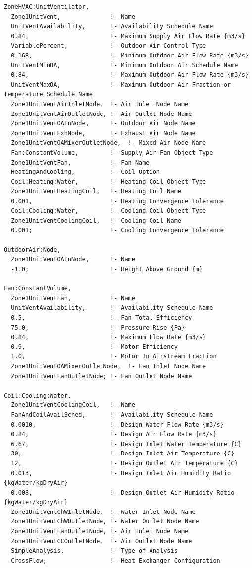 \begin{lstlisting}
ZoneHVAC:UnitVentilator,
  Zone1UnitVent,              !- Name
  UnitVentAvailability,       !- Availability Schedule Name
  0.84,                       !- Maximum Supply Air Flow Rate {m3/s}
  VariablePercent,            !- Outdoor Air Control Type
  0.168,                      !- Minimum Outdoor Air Flow Rate {m3/s}
  UnitVentMinOA,              !- Minimum Outdoor Air Schedule Name
  0.84,                       !- Maximum Outdoor Air Flow Rate {m3/s}
  UnitVentMaxOA,              !- Maximum Outdoor Air Fraction or Temperature Schedule Name
  Zone1UnitVentAirInletNode,  !- Air Inlet Node Name
  Zone1UnitVentAirOutletNode, !- Air Outlet Node Name
  Zone1UnitVentOAInNode,      !- Outdoor Air Node Name
  Zone1UnitVentExhNode,       !- Exhaust Air Node Name
  Zone1UnitVentOAMixerOutletNode,  !- Mixed Air Node Name
  Fan:ConstantVolume,         !- Supply Air Fan Object Type
  Zone1UnitVentFan,           !- Fan Name
  HeatingAndCooling,          !- Coil Option
  Coil:Heating:Water,         !- Heating Coil Object Type
  Zone1UnitVentHeatingCoil,   !- Heating Coil Name
  0.001,                      !- Heating Convergence Tolerance
  Coil:Cooling:Water,         !- Cooling Coil Object Type
  Zone1UnitVentCoolingCoil,   !- Cooling Coil Name
  0.001;                      !- Cooling Convergence Tolerance

OutdoorAir:Node,
  Zone1UnitVentOAInNode,      !- Name
  -1.0;                       !- Height Above Ground {m}

Fan:ConstantVolume,
  Zone1UnitVentFan,           !- Name
  UnitVentAvailability,       !- Availability Schedule Name
  0.5,                        !- Fan Total Efficiency
  75.0,                       !- Pressure Rise {Pa}
  0.84,                       !- Maximum Flow Rate {m3/s}
  0.9,                        !- Motor Efficiency
  1.0,                        !- Motor In Airstream Fraction
  Zone1UnitVentOAMixerOutletNode,  !- Fan Inlet Node Name
  Zone1UnitVentFanOutletNode; !- Fan Outlet Node Name

Coil:Cooling:Water,
  Zone1UnitVentCoolingCoil,   !- Name
  FanAndCoilAvailSched,       !- Availability Schedule Name
  0.0010,                     !- Design Water Flow Rate {m3/s}
  0.84,                       !- Design Air Flow Rate {m3/s}
  6.67,                       !- Design Inlet Water Temperature {C}
  30,                         !- Design Inlet Air Temperature {C}
  12,                         !- Design Outlet Air Temperature {C}
  0.013,                      !- Design Inlet Air Humidity Ratio {kgWater/kgDryAir}
  0.008,                      !- Design Outlet Air Humidity Ratio {kgWater/kgDryAir}
  Zone1UnitVentChWInletNode,  !- Water Inlet Node Name
  Zone1UnitVentChWOutletNode, !- Water Outlet Node Name
  Zone1UnitVentFanOutletNode, !- Air Inlet Node Name
  Zone1UnitVentCCOutletNode,  !- Air Outlet Node Name
  SimpleAnalysis,             !- Type of Analysis
  CrossFlow;                  !- Heat Exchanger Configuration


\end{lstlisting}
